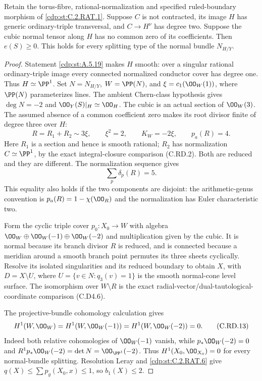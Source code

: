
\begin{proposition}\label{cdp:st:C.2.RAT.7}
Retain the torus-fibre, rational-normalization and specified
ruled-boundary morphism of \ref{cdp:st:C.2.RAT.1}. Suppose $C$ is not
contracted, its image $H$ has generic ordinary-triple
transversal, and $C\to H^\nu$ has degree two. Suppose
the cubic normal tensor along $H$ has no common zero of
its coefficients. Then $e(S)\ge0$. This holds for every
splitting type of the normal bundle $N_{H/Y}$.
\end{proposition}
\begin{proof}
Statement \ref{cdp:st:A.5.19} makes $H$ smooth: over a singular
rational ordinary-triple image every connected normalized
conductor cover has degree one. Thus $H\simeq\PP^1$.
Set $N=N_{H/Y}$, $W=\PP(N)$, and
$\xi=c_1(\OO_W(1))$, where $\PP(N)$ parameterizes lines.
The ambient Chern-class hypothesis gives
$\deg N=-2$ and $\OO_Y(S)|_H\simeq\OO_H$.
The cubic is an actual section of $\OO_W(3)$.
The assumed absence of a common coefficient zero makes
its root divisor finite of degree three over $H$:
\[
 R=R_1+R_2\sim3\xi,\qquad
 \xi^2=2,\qquad K_W=-2\xi,\qquad p_a(R)=4.
\tag{C.RD.11}\label{cdp:eq:C.RD.11}
\]
Here $R_1$ is a section and hence is smooth rational;
$R_2$ has normalization $C\simeq\PP^1$, by the exact
integral-closure comparison (C.RD.2). Both are reduced
and they are different. The normalization sequence gives
\[
                  \sum_p\delta_p(R)=5.
\tag{C.RD.12}\label{cdp:eq:C.RD.12}
\]
This equality also holds if the two components are
disjoint: the arithmetic-genus convention is
$p_a(R)=1-\chi(\OO_R)$ and the normalization has Euler
characteristic two.

Form the cyclic triple cover
$p_0:X_0\to W$ with algebra
$\OO_W\oplus\OO_W(-1)\oplus\OO_W(-2)$ and multiplication
given by the cubic. It is normal because its branch
divisor $R$ is reduced, and is connected because a
meridian around a smooth branch point permutes its
three sheets cyclically. Resolve its isolated
singularities and its reduced boundary to obtain
$X$, with $D=X\setminus U$, where
$U=\{v\in N:q_3(v)=1\}$ is the smooth normal-cone
level surface. The isomorphism over $W\setminus R$
is the exact radial-vector/dual-tautological-coordinate
comparison (C.D4.6).

The projective-bundle cohomology calculation gives
\[
 H^1(W,\OO_W)=H^1(W,\OO_W(-1))
             =H^1(W,\OO_W(-2))=0.
\tag{C.RD.13}\label{cdp:eq:C.RD.13}
\]
Indeed both relative cohomologies of $\OO_W(-1)$
vanish, while $p_*\OO_W(-2)=0$ and
$R^1p_*\OO_W(-2)=\det N=\OO_{\PP^1}(-2)$.
Thus $H^1(X_0,\OO_{X_0})=0$ for every normal-bundle
splitting. Resolution Leray and \ref{cdp:st:C.2.RAT.6} give
$q(X)\le\sum p_g(X_0,x)\le1$, so $b_1(X)\le2$.


\end{proof}
